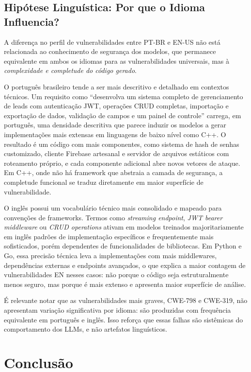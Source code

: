 \documentclass[12pt]{article}
\begin{document}
\subsection{Hipótese Linguística: Por que o Idioma Influencia?}

A diferença no perfil de vulnerabilidades entre PT-BR e EN-US não está relacionada ao conhecimento de segurança dos modelos, que permanece equivalente em ambos os idiomas para as vulnerabilidades universais, mas à \textit{complexidade e completude do código gerado}.

O português brasileiro tende a ser mais descritivo e detalhado em contextos técnicos. Um requisito como ``desenvolva um sistema completo de gerenciamento de leads com autenticação JWT, operações CRUD completas, importação e exportação de dados, validação de campos e um painel de controle'' carrega, em português, uma densidade descritiva que parece induzir os modelos a gerar implementações mais extensas em linguagens de baixo nível como C++. O resultado é um código com mais componentes, como sistema de hash de senhas customizado, cliente Firebase artesanal e servidor de arquivos estáticos com roteamento próprio, e cada componente adicional abre novos vetores de ataque. Em C++, onde não há framework que abstraia a camada de segurança, a completude funcional se traduz diretamente em maior superfície de vulnerabilidade.

O inglês possui um vocabulário técnico mais consolidado e mapeado para convenções de frameworks. Termos como \textit{streaming endpoint}, \textit{JWT bearer middleware} ou \textit{CRUD operations} ativam em modelos treinados majoritariamente em inglês padrões de implementação específicos e frequentemente mais sofisticados, porém dependentes de funcionalidades de bibliotecas. Em Python e Go, essa precisão técnica leva a implementações com mais middlewares, dependências externas e endpoints avançados, o que explica a maior contagem de vulnerabilidades EN nesses casos: não porque o código seja estruturalmente menos seguro, mas porque é mais extenso e apresenta maior superfície de análise.

É relevante notar que as vulnerabilidades mais graves, CWE-798 e CWE-319, não apresentam variação significativa por idioma: são produzidas com frequência equivalente em português e inglês. Isso reforça que essas falhas são sistêmicas do comportamento dos LLMs, e não artefatos linguísticos.

\section{Conclusão}
\label{sec:conclusao}
\end{document}
